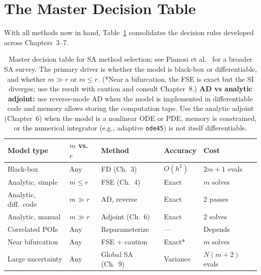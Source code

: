 \section{The Master Decision Table}
\label{sec:mastertable}

With all methods now in hand, Table~\ref{tab:masterSA} consolidates
the decision rules developed across Chapters~3--7.

\begin{table}[htb]
\centering
\footnotesize
\renewcommand{\arraystretch}{1.2}
\begin{tabular}{p{2.8cm}p{1.9cm}p{2.4cm}p{1.8cm}p{3.5cm}}
\toprule
Model type & $m$ vs.\ $r$ & Method & Accuracy & Cost \\
\midrule
Black-box & Any & FD (Ch.~3) & $O(h^2)$ & $2m{+}1$ evals \\
Analytic, simple & $m \leq r$ & FSE (Ch.~4) & Exact & $m$ solves \\
Analytic, diff.\ code & $m \gg r$ & AD, reverse & Exact & 2 passes \\
Analytic, manual & $m \gg r$ & Adjoint (Ch.~6) & Exact & 2 solves \\
Correlated POIs & Any & Reparameterize & --- & Depends \\
Near bifurcation & Any & FSE + caution & Exact* & $m$ solves \\
Large uncertainty & Any & Global SA (Ch.~9) & Variance & $N(m{+}2)$ evals \\
\bottomrule
\end{tabular}
\caption{Master decision table for SA method selection;
         see Pianosi et al.~\cite{pianosi2016sensitivity} for a broader SA survey.
         The primary driver is whether the model is black-box or
         differentiable, and whether $m \gg r$ or $m \leq r$.
         (*Near a bifurcation, the FSE is exact but the SI diverges;
         use the result with caution and consult Chapter~8.)
         \textbf{AD vs analytic adjoint:}
         use reverse-mode AD when the model is implemented in differentiable code
         and memory allows storing the computation tape.
         Use the analytic adjoint (Chapter~6) when the model is a nonlinear ODE or PDE,
         memory is constrained, or the numerical integrator (e.g., adaptive \texttt{ode45})
         is not itself differentiable.}
\label{tab:masterSA}
\end{table}

